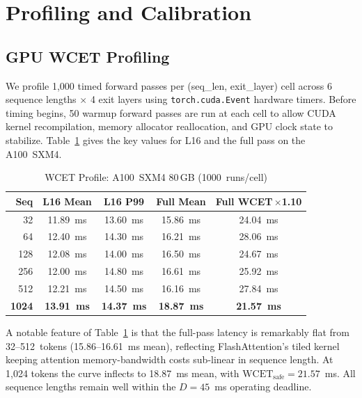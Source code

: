 \documentclass[conference]{IEEEtran}
\begin{document}
\section{Profiling and Calibration}

\subsection{GPU WCET Profiling}
\label{sec:profiling}

We profile 1{,}000 timed forward passes per (seq\_len, exit\_layer) cell
across 6 sequence lengths $\times$ 4 exit layers using
\texttt{torch.cuda.Event} hardware timers.
Before timing begins, 50 warmup forward passes are run at each cell to
allow CUDA kernel recompilation, memory allocator reallocation, and GPU
clock state to stabilize.
Table~\ref{tab:wcet} gives the key values for L16 and the full pass
on the A100~SXM4.

\begin{table}[htbp]
\caption{WCET Profile: A100~SXM4 80\,GB (1000~runs/cell)}
\centering
\setlength{\tabcolsep}{3.5pt}
\begin{tabular}{@{}rcccc@{}}
\toprule
\textbf{Seq} & \textbf{L16 Mean} & \textbf{L16 P99}
             & \textbf{Full Mean} & \textbf{Full WCET\,${\times}$1.10} \\
\midrule
32   & 11.89~ms & 13.60~ms & 15.86~ms & 24.04~ms \\
64   & 12.40~ms & 14.30~ms & 16.21~ms & 28.06~ms \\
128  & 12.08~ms & 14.00~ms & 16.50~ms & 24.67~ms \\
256  & 12.00~ms & 14.80~ms & 16.61~ms & 25.92~ms \\
512  & 12.21~ms & 14.50~ms & 16.16~ms & 27.84~ms \\
\textbf{1024} & \textbf{13.91~ms} & \textbf{14.37~ms}
              & \textbf{18.87~ms} & \textbf{21.57~ms} \\
\bottomrule
\end{tabular}
\label{tab:wcet}
\end{table}

A notable feature of Table~\ref{tab:wcet} is that the full-pass latency
is remarkably flat from 32--512~tokens (15.86--16.61~ms mean),
reflecting FlashAttention's tiled kernel keeping attention memory-bandwidth
costs sub-linear in sequence length.
At 1{,}024 tokens the curve inflects to 18.87~ms mean, with
$\text{WCET}_{\text{safe}} = 21.57$~ms.
All sequence lengths remain well within the $D=45$~ms operating
deadline.
\end{document}
